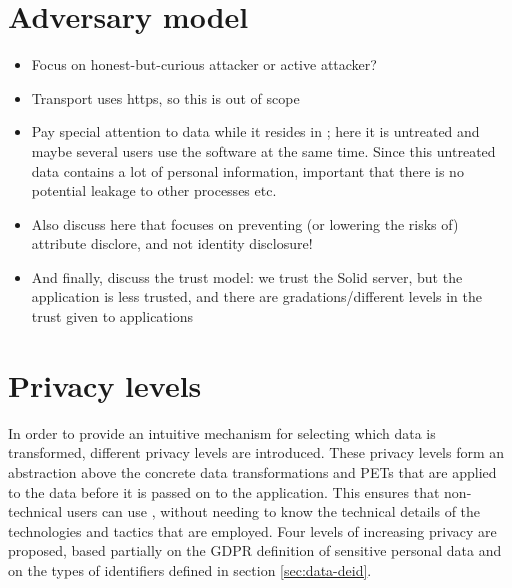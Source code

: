 \section{Adversary model}
\begin{itemize}
    \item Focus on honest-but-curious attacker or active attacker?
    \item Transport uses https, so this is out of scope
    \item Pay special attention to data while it resides in \middleware{}; here it is untreated and maybe several users use the software at the same time. Since this untreated data contains a lot of personal information, important that there is no potential leakage to other processes etc. 
    \item Also discuss here that \middleware{} focuses on preventing (or lowering the risks of) attribute disclore, and not identity disclosure!
    \item And finally, discuss the trust model: we trust the Solid server, but the application is less trusted, and there are gradations/different levels in the trust given to applications
\end{itemize}

\section{Privacy levels}
\label{sec:privacylevels}
In order to provide an intuitive mechanism for selecting which data is transformed, different privacy levels are introduced. These privacy levels form an abstraction above the concrete data transformations and \gls{PETs} that are applied to the data before it is passed on to the application. This ensures that non-technical users can use \middleware{}, without needing to know the technical details of the technologies and tactics that are employed. Four levels of increasing privacy are proposed, based partially on the \gls{GDPR} definition of sensitive personal data and on the types of identifiers defined in section \ref{sec:data-deid}.\\

